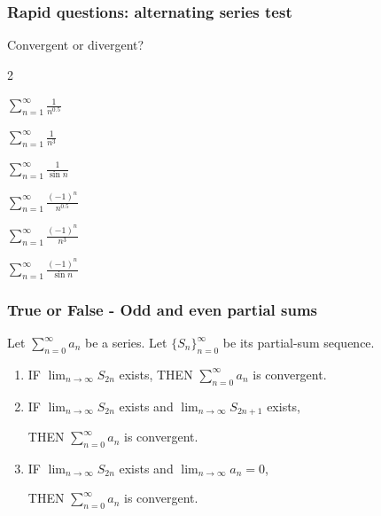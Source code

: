 \documentclass[14pt]{beamer}
\begin{document}
\begin{frame}[t]
	\frametitle{Rapid questions: alternating series test}

	Convergent or divergent?

	\begin{enumerate}
	\end{enumerate}
\end{frame}

\begin{frame}[t]
	\fontsize{12}{12}\selectfont
	\frametitle{True or False - Odd and even partial sums}

	Let $\displaystyle \sum_{n=0}^{\infty}a_{n}$ be a series. Let
	$\displaystyle \{ S_{n}\}_{n=0}^{\infty}$ be its partial-sum sequence.

	\begin{enumerate}
		\item IF $\displaystyle \lim_{n \to \infty}S_{2n}$ exists, \quad THEN \;
			{\color{blue} $\displaystyle \sum_{n=0}^{\infty}a_{n}$ is convergent}.
			\vspace{.5cm}

		\item IF $\displaystyle \lim_{n \to \infty}S_{2n}$ exists \; and \; $\displaystyle
			\lim_{n \to \infty}S_{2n+1}$ exists,

			THEN \; {\color{blue} $\displaystyle \sum_{n=0}^{\infty}a_{n}$ is convergent}.
			\vspace{.5cm}

		\item IF $\displaystyle \lim_{n \to \infty}S_{2n}$ exists \; and \; $\displaystyle
			\lim_{n \to \infty}a_{n}= 0$,

			THEN \; {\color{blue} $\displaystyle \sum_{n=0}^{\infty}a_{n}$ is convergent}.
	\end{enumerate}
\end{frame}
\end{document}
